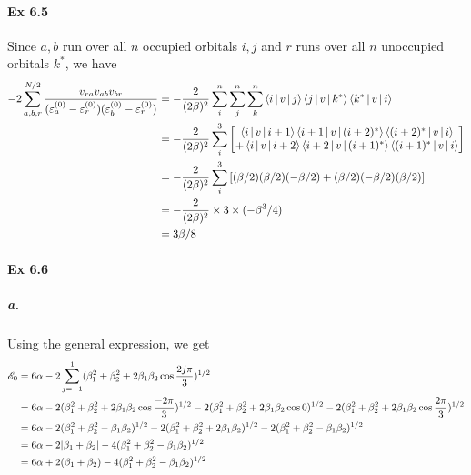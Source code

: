 \documentclass[a4paper]{article}
\newcommand{\ex}[1]{\paragraph{Ex #1}}
\newcommand{\subex}[1]{\subparagraph{#1}}
\numberwithin{equation}{subsection}
\begin{document}
\ex{6.5}
Since $ a,b $ run over all $ n $ occupied orbitals $ i,j $ and $ r $ runs over all $ n $ unoccupied orbitals $ k^* $, we have
\begin{align}
-2\sum_{a,b,r}^{N/2} \dfrac{v_{ra}v_{ab}v_{br}}{(\varepsilon_a^{(0)} - \varepsilon_r^{(0)}) (\varepsilon_b^{(0)} - \varepsilon_r^{(0)})} 
&= -\dfrac{2}{(2\beta)^2} \sum_i^n \sum_j^n \sum_k^n \Braket{i|v|j} \Braket{j|v|k^*} \Braket{k^*|v|i} \notag\\
&= -\dfrac{2}{(2\beta)^2} \sum_i^3
\mqty[\Braket{i|v|i+1} \Braket{i+1|v|(i+2)^*} \Braket{(i+2)^*|v|i} \\
+ \Braket{i|v|i+2} \Braket{i+2|v|(i+1)^*} \Braket{(i+1)^*|v|i} ] \notag\\
&= -\dfrac{2}{(2\beta)^2} \sum_i^3 \qty[(\beta/2)(\beta/2)(-\beta/2) + (\beta/2)(-\beta/2)(\beta/2)] \notag\\
&= -\dfrac{2}{(2\beta)^2} \times 3\times (-\beta^3/4) \notag\\
&= 3\beta/8
\end{align}

\ex{6.6}
\subex{a.}
Using the general expression, we get
\begin{align}
\mathscr{E}_0 &= 6\alpha - 2\sum_{j=-1}^1 (\beta_1^2 + \beta_2^2 + 2\beta_1\beta_2\cos\dfrac{2j\pi}{3})^{1/2} \notag\\
&= 6\alpha - 2(\beta_1^2 + \beta_2^2 + 2\beta_1\beta_2\cos\dfrac{-2\pi}{3})^{1/2}
- 2(\beta_1^2 + \beta_2^2 + 2\beta_1\beta_2\cos 0)^{1/2}
- 2(\beta_1^2 + \beta_2^2 + 2\beta_1\beta_2\cos\dfrac{2\pi}{3})^{1/2} 
\notag\\
&= 6\alpha - 2(\beta_1^2 + \beta_2^2 - \beta_1\beta_2)^{1/2}
- 2(\beta_1^2 + \beta_2^2 + 2\beta_1\beta_2)^{1/2}
- 2(\beta_1^2 + \beta_2^2 - \beta_1\beta_2)^{1/2} \notag\\
&= 6\alpha 
- 2\abs{\beta_1 + \beta_2}
- 4(\beta_1^2 + \beta_2^2 - \beta_1\beta_2)^{1/2} \notag\\
&= 6\alpha + 2(\beta_1 + \beta_2)
- 4(\beta_1^2 + \beta_2^2 - \beta_1\beta_2)^{1/2}
\end{align}
\end{document}
